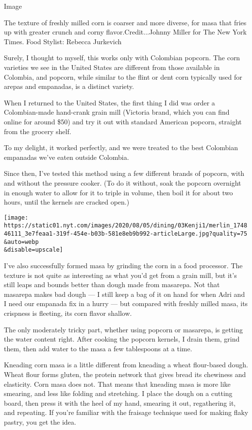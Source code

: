 Image

The texture of freshly milled corn is coarser and more diverse, for masa
that fries up with greater crunch and corny flavor.Credit...Johnny
Miller for The New York Times. Food Stylist: Rebecca Jurkevich

Surely, I thought to myself, this works only with Colombian popcorn. The
corn varieties we see in the United States are different from those
available in Colombia, and popcorn, while similar to the flint or dent
corn typically used for arepas and empanadas, is a distinct variety.

When I returned to the United States, the first thing I did was order a
Colombian-made hand-crank grain mill (Victoria brand, which you can find
online for around \$50) and try it out with standard American popcorn,
straight from the grocery shelf.

To my delight, it worked perfectly, and we were treated to the best
Colombian empanadas we've eaten outside Colombia.

Since then, I've tested this method using a few different brands of
popcorn, with and without the pressure cooker. (To do it without, soak
the popcorn overnight in enough water to allow for it to triple in
volume, then boil it for about two hours, until the kernels are cracked
open.)

\texttt{[image: https://static01.nyt.com/images/2020/08/05/dining/03Kenji1/merlin\_174846111\_3e7feaa1-319f-454e-b03b-581e8eb9b992-articleLarge.jpg?quality=75\\\&auto=webp\\\&disable=upscale]}

I've also successfully formed masa by grinding the corn in a food
processor. The texture is not quite as interesting as what you'd get
from a grain mill, but it's still leaps and bounds better than dough
made from masarepa. Not that masarepa makes bad dough --- I still keep a
bag of it on hand for when Adri and I need our empanada fix in a hurry
--- but compared with freshly milled masa, its crispness is fleeting,
its corn flavor shallow.

The only moderately tricky part, whether using popcorn or masarepa, is
getting the water content right. After cooking the popcorn kernels, I
drain them, grind them, then add water to the masa a few tablespoons at
a time.

Kneading corn masa is a little different from kneading a wheat
flour-based dough. Wheat flour forms gluten, the protein network that
gives bread its chewiness and elasticity. Corn masa does not. That means
that kneading masa is more like smearing, and less like folding and
stretching. I place the dough on a cutting board, then press it with the
heel of my hand, smearing it out, regathering it, and repeating. If
you're familiar with the fraisage technique used for making flaky
pastry, you get the idea.

